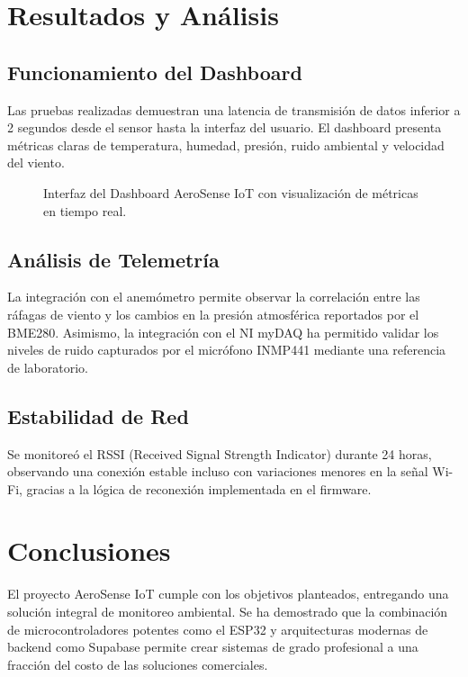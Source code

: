 \chapter{Resultados y Análisis}

\section{Funcionamiento del Dashboard}
Las pruebas realizadas demuestran una latencia de transmisión de datos inferior a 2 segundos desde el sensor hasta la interfaz del usuario. El dashboard presenta métricas claras de temperatura, humedad, presión, ruido ambiental y velocidad del viento.

\begin{figure}[H]
    \centering
    \caption{Interfaz del Dashboard AeroSense IoT con visualización de métricas en tiempo real.}
    \label{fig:dashboard}
\end{figure}

\section{Análisis de Telemetría}
La integración con el anemómetro permite observar la correlación entre las ráfagas de viento y los cambios en la presión atmosférica reportados por el BME280. Asimismo, la integración con el NI myDAQ ha permitido validar los niveles de ruido capturados por el micrófono INMP441 mediante una referencia de laboratorio.

\section{Estabilidad de Red}
Se monitoreó el RSSI (Received Signal Strength Indicator) durante 24 horas, observando una conexión estable incluso con variaciones menores en la señal Wi-Fi, gracias a la lógica de reconexión implementada en el firmware.

\chapter{Conclusiones}

El proyecto AeroSense IoT cumple con los objetivos planteados, entregando una solución integral de monitoreo ambiental. Se ha demostrado que la combinación de microcontroladores potentes como el ESP32 y arquitecturas modernas de backend como Supabase permite crear sistemas de grado profesional a una fracción del costo de las soluciones comerciales.

